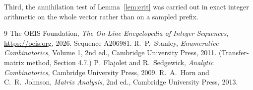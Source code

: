 \documentclass[11pt,a4paper]{article}
\theoremstyle{plain}
\theoremstyle{definition}
\begin{document}
Third, the annihilation test of Lemma~\ref{lem:crit} was carried out in exact integer
arithmetic on the whole vector rather than on a sampled prefix.

\begin{thebibliography}{9}
 The OEIS Foundation, \emph{The On-Line Encyclopedia of Integer
Sequences}, \url{https://oeis.org}, 2026. Sequence A206981.
 R.~P.~Stanley, \emph{Enumerative Combinatorics}, Volume 1, 2nd ed.,
Cambridge University Press, 2011. (Transfer-matrix method, Section 4.7.)
 P.~Flajolet and R.~Sedgewick, \emph{Analytic Combinatorics}, Cambridge
University Press, 2009.
 R.~A.~Horn and C.~R.~Johnson, \emph{Matrix Analysis}, 2nd ed., Cambridge
University Press, 2013.
\end{thebibliography}
\end{document}
